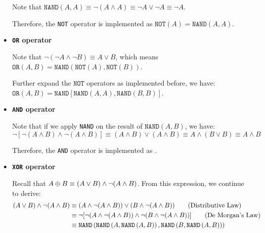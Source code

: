 \documentclass[answers]{exam}
\begin{document}
\begin{questions}
\begin{parts}
\begin{solution}
\begin{itemize}
                Note that $\texttt{NAND}(A, A) \equiv \neg (A \land A) \equiv \neg A \lor \neg A \equiv \neg A$.
                
                Therefore, the \texttt{NOT} operator is implemented as $\boxed{\texttt{NOT}(A) = \texttt{NAND}(A, A)}$.

                \item \textbf{\texttt{OR} operator}
                
                Note that $\neg(\neg A \land \neg B) \equiv A \lor B$,
                which means $\texttt{OR}(A, B)=\texttt{NAND}(\texttt{NOT}(A), \texttt{NOT}(B))$.
                
                Further expand the $\texttt{NOT}$ operators as implemented before, we have:
                $\boxed{\texttt{OR}(A, B)=\texttt{NAND}\left[\texttt{NAND}(A, A), \texttt{NAND}(B,B)\right]}$.

                \item \textbf{\texttt{AND} operator}
                
                Note that if we apply \texttt{NAND} on the result of $\texttt{NAND}(A, B)$, we have:
                $$\neg\left[\neg\left(A\land B\right)\land\neg\left(A\land B\right)\right]
                \equiv \left(A\land B\right)\lor\left(A \land B\right)
                \equiv A \land \left(B \lor B\right)
                \equiv A \land B$$

                Therefore, the \texttt{AND} operator is implemented as
                .

                \item \textbf{\texttt{XOR} operator}
                
                Recall that $A\oplus B
                \equiv (A\lor B)\land\neg(A\land B)$. From this expression, we continue to derive:
                \begin{align*}
                    (A\lor B)\land\neg(A\land B)
                    &\equiv (A\land\neg(A\land B))\lor(B\land\neg(A\land B)) \qquad\text{(Distributive Law)}\\
                    &\equiv \neg[\neg(A\land\neg(A\land B))\land\neg(B\land\neg(A\land B))] \qquad\text{(De Morgan's Law)}\\
                    &\equiv \texttt{NAND}\left(
                        \texttt{NAND}\left(A, \texttt{NAND}\left(A, B\right)\right)
                    , 
                        \texttt{NAND}\left(B, \texttt{NAND}\left(A, B\right)\right)
                    \right)
                \end{align*}


\end{itemize}
\end{solution}
\end{parts}
\end{questions}
\end{document}
